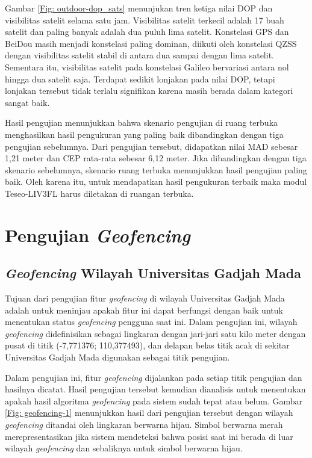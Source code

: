 Gambar \ref{Fig: outdoor-dop_sats} menunjukan tren ketiga nilai DOP dan visibilitas satelit selama satu jam. Visibilitas satelit terkecil adalah 17 buah satelit dan paling banyak adalah dua puluh lima satelit. Konstelasi GPS dan BeiDou masih menjadi konstelasi paling dominan, diikuti oleh konstelasi QZSS dengan visibilitas satelit stabil di antara dua sampai dengan lima satelit. Sementara itu, visibilitas satelit pada konstelasi Galileo bervariasi antara nol hingga dua satelit saja. Terdapat sedikit lonjakan pada nilai DOP, tetapi lonjakan tersebut tidak terlalu signifikan karena masih berada dalam kategori sangat baik.

Hasil pengujian menunjukkan bahwa skenario pengujian di ruang terbuka menghasilkan hasil pengukuran yang paling baik dibandingkan dengan tiga pengujian sebelumnya. Dari pengujian tersebut, didapatkan nilai MAD sebesar 1,21 meter dan CEP rata-rata sebesar 6,12 meter. Jika dibandingkan dengan tiga skenario sebelumnya, skenario ruang terbuka menunjukkan hasil pengujian paling baik. Oleh karena itu, untuk mendapatkan hasil pengukuran terbaik maka modul Teseo-LIV3FL harus diletakan di ruangan terbuka.

\section{Pengujian \textit{Geofencing}}
\subsection{\textit{Geofencing} Wilayah Universitas Gadjah Mada}
Tujuan dari pengujian fitur \textit{geofencing} di wilayah Universitas Gadjah Mada adalah untuk meninjau apakah fitur ini dapat berfungsi dengan baik untuk menentukan status \textit{geofencing} pengguna saat ini. Dalam pengujian ini, wilayah \textit{geofencing} didefinisikan sebagai lingkaran dengan jari-jari satu kilo meter dengan pusat di titik (-7,771376; 110,377493), dan delapan belas titik acak di sekitar Universitas Gadjah Mada digunakan sebagai titik pengujian.

Dalam pengujian ini, fitur \textit{geofencing} dijalankan pada setiap titik pengujian dan hasilnya dicatat. Hasil pengujian tersebut kemudian dianalisis untuk menentukan apakah hasil algoritma \textit{geofencing} pada sistem sudah tepat atau belum. Gambar \ref{Fig: geofencing-1} menunjukkan hasil dari pengujian tersebut dengan wilayah \textit{geofencing} ditandai oleh lingkaran berwarna hijau. Simbol berwarna merah merepresentasikan jika sistem mendeteksi bahwa posisi saat ini berada di luar wilayah \textit{geofencing} dan sebaliknya untuk simbol berwarna hijau.

